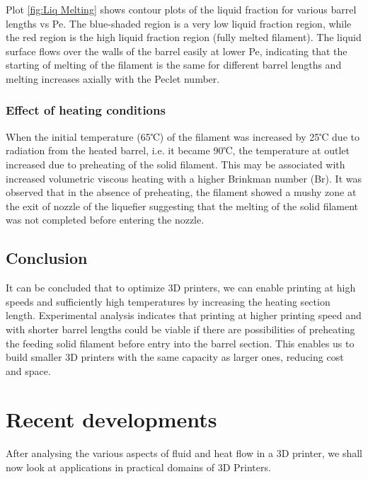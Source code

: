 \documentclass{report}
\begin{document}
{Plot \ref{fig:Liq Melting} shows contour plots of the liquid fraction for various barrel lengths vs Pe. The blue-shaded region is a very low liquid fraction region, while the red region is the high liquid fraction region (fully melted filament). The liquid surface flows over the walls of the barrel easily at lower Pe, indicating that the starting of melting of the filament is the same for different barrel lengths and melting increases axially with the Peclet number.

\subsection{Effect of heating conditions}

When the initial temperature (65℃) of the filament was increased by 25℃ due to radiation from the heated barrel, i.e. it became 90℃, the temperature at outlet increased due to preheating of the solid filament. This may be associated with increased volumetric viscous heating with a higher Brinkman number (Br). It was observed that in the absence of preheating, the filament showed a mushy zone at the exit of nozzle of the liquefier suggesting that the melting of the solid filament was not completed before entering the nozzle.

\section{Conclusion}

It can be concluded that to optimize 3D printers, we can enable printing at high speeds and sufficiently high temperatures by increasing the heating section length. Experimental analysis indicates that printing at higher printing speed and with shorter barrel lengths could be viable if there are possibilities of preheating the feeding solid filament before entry into the barrel section. This enables us to build smaller 3D printers with the same capacity as larger ones, reducing cost and space. 

\chapter{Recent developments}
After analysing the various aspects of fluid and heat flow in a 3D printer, we shall now look at applications in practical domains of 3D Printers.

}
\end{document}

